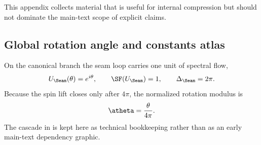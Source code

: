 This appendix collects material that is useful for internal compression but should not dominate the main-text scope of explicit claims.

\subsection{Global rotation angle and constants atlas}

On the canonical branch the seam loop carries one unit of spectral flow,
\[
U_{\Seam}(\theta)=e^{i\theta},
\qquad
\SF(U_{\Seam})=1,
\qquad
\Delta_{\Seam}=2\pi.
\]
Because the spin lift closes only after $4\pi$, the normalized rotation modulus is
\[
\atheta=\frac{\theta}{4\pi}.
\]
The cascade in  is kept here as technical bookkeeping rather than as an early main-text dependency graphic.


